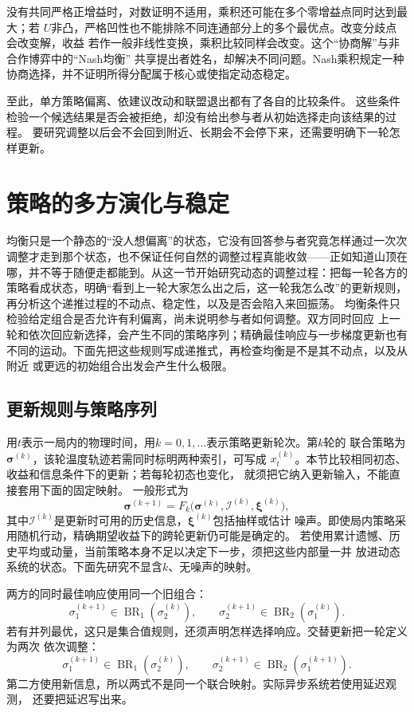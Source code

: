 没有共同严格正增益时，对数证明不适用，乘积还可能在多个零增益点同时达到最大；若
\(U\)非凸，严格凹性也不能排除不同连通部分上的多个最优点。改变分歧点会改变解，收益
若作一般非线性变换，乘积比较同样会改变。这个“协商解”与非合作博弈中的“Nash均衡”
共享提出者姓名，却解决不同问题。Nash乘积规定一种协商选择，并不证明所得分配属于核心或使指定动态稳定。

至此，单方策略偏离、依建议改动和联盟退出都有了各自的比较条件。
这些条件检验一个候选结果是否会被拒绝，却没有给出参与者从初始选择走向该结果的过程。
要研究调整以后会不会回到附近、长期会不会停下来，还需要明确下一轮怎样更新。

\section{策略的多方演化与稳定}
\label{sec:game-policy-evolution}

均衡只是一个静态的“没人想偏离”的状态，它没有回答参与者究竟怎样通过一次次调整才走到那个状态，也不保证任何自然的调整过程真能收敛——正如知道山顶在哪，并不等于随便走都能到。从这一节开始研究动态的调整过程：把每一轮各方的策略看成状态，明确“看到上一轮大家怎么出之后，这一轮我怎么改”的更新规则，再分析这个递推过程的不动点、稳定性，以及是否会陷入来回振荡。
均衡条件只检验给定组合是否允许有利偏离，尚未说明参与者如何调整。双方同时回应
上一轮和依次回应新选择，会产生不同的策略序列；精确最佳响应与一步梯度更新也有
不同的运动。下面先把这些规则写成递推式，再检查均衡是不是其不动点，以及从附近
或更远的初始组合出发会产生什么极限。

\subsection{更新规则与策略序列}
\label{sec:game-update-sequences}

用\(t\)表示一局内的物理时间，用\(k=0,1,\ldots\)表示策略更新轮次。第\(k\)轮的
联合策略为\(\bm\sigma^{(k)}\)，该轮温度轨迹若需同时标明两种索引，可写成
\(x_t^{(k)}\)。本节比较相同初态、收益和信息条件下的更新；若每轮初态也变化，
就须把它纳入更新输入，不能直接套用下面的固定映射。
一般形式为
\[
  \bm\sigma^{(k+1)}
  =F_k\bigl(\bm\sigma^{(k)},\mathscr I^{(k)},\bm\xi^{(k)}\bigr),
\]
其中\(\mathscr I^{(k)}\)是更新时可用的历史信息，\(\bm\xi^{(k)}\)包括抽样或估计
噪声。即使局内策略采用随机行动，精确期望收益下的跨轮更新仍可能是确定的。
若使用累计遗憾、历史平均或动量，当前策略本身不足以决定下一步，须把这些内部量一并
放进动态系统的状态。下面先研究不显含\(k\)、无噪声的映射。

两方的同时最佳响应使用同一个旧组合：
\begin{equation}
  \sigma_1^{(k+1)}\in\operatorname{BR}_1(\sigma_2^{(k)}),
  \qquad
  \sigma_2^{(k+1)}\in\operatorname{BR}_2(\sigma_1^{(k)}).
  \label{eq:game-simultaneous-best-response}
\end{equation}
若有并列最优，这只是集合值规则，还须声明怎样选择响应。交替更新把一轮定义为两次
依次调整：
\begin{equation}
  \sigma_1^{(k+1)}\in\operatorname{BR}_1(\sigma_2^{(k)}),
  \qquad
  \sigma_2^{(k+1)}\in\operatorname{BR}_2(\sigma_1^{(k+1)}).
  \label{eq:game-alternating-best-response}
\end{equation}
第二方使用新信息，所以两式不是同一个联合映射。实际异步系统若使用延迟观测，
还要把延迟写出来。

